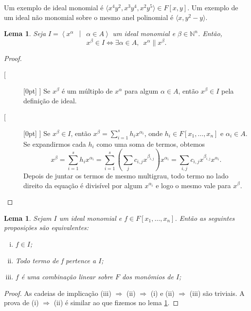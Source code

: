 \documentclass[12pt,a4paper]{report}
\newcommand{\N}{\mathbb{N}}
\newcommand{\suchthat}{\enspace\middle|\enspace}
\newcommand{\divides}{\parallel}
\newcommand{\boxedLeftArrow}{\raisebox{2pt}[\height][0pt]{
    \framebox{\raisebox{-1pt}[\height][0pt]{\(\Leftarrow\)}}}\enspace}
\newcommand{\boxedRightArrow}{\raisebox{2pt}[\height][0pt]{
    \framebox{\raisebox{-1pt}[\height][0pt]{\(\Rightarrow\)}}}\enspace}
\newtheorem{lemma}[theorem]{Lema}
\numberwithin{theorem}{chapter}
\begin{document}
Um exemplo de ideal monomial é \(\langle x^4y^2, x^3y^4, x^2y^5
\rangle \in F[x,y]\).  Um exemplo de um ideal não monomial sobre o
mesmo anel polinomial é \(\langle x, y^2-y \rangle\).

\begin{lemma}\label{lema_pertence_ao_ideal}
  Seja \(I = \left\langle x^\alpha \suchthat \alpha \in A
  \right\rangle\) um ideal monomial e \(\beta \in \N^n\).  Então,
  \[x^\beta \in I \Longleftrightarrow \exists\alpha \in A,\enspace
  x^\alpha \divides x^\beta.\]
\end{lemma}

\begin{proof}\mbox{}
  \begin{description}
    \item[\boxedLeftArrow] Se \(x^\beta\) é um múltiplo de
      \(x^\alpha\) para algum \(\alpha \in A\), então \(x^\beta \in
      I\) pela definição de ideal.

    \item[\boxedRightArrow] Se \(x^\beta \in I\), então \(x^\beta =
      \sum\limits_{i=1}^s{h_ix^{\alpha_i}}\), onde \(h_i \in
      F[x_1,\ldots,x_n]\) e \(\alpha_i \in A\).  Se expandirmos cada
      \(h_i\) como uma soma de termos, obtemos
      \[x^\beta = \sum_{i=1}^s{h_ix^{\alpha_i}} =
      \sum_{i=1}^s\left(\sum_j
        c_{i,j}x^{\beta_{i,j}}\right)x^{\alpha_i} =
      \sum_{i,j}c_{i,j}x^{\beta_{i,j}}x^{\alpha_i}.\] Depois de juntar
      os termos de mesmo multigrau, todo termo no lado direito da
      equação é divisível por algum \(x^{\alpha_i}\) e logo o mesmo
      vale para \(x^\beta\).
    \end{description}
\end{proof}

\begin{lemma}
  Sejam \(I\) um ideal monomial e \(f \in F[x_1,\ldots,x_n]\).  Então
  as seguintes proposições são equivalentes:
  \begin{enumerate}[(i)]
  \item \(f \in I\);
  \item Todo termo de f pertence a \(I\);
  \item \(f\) é uma combinação linear sobre \(F\) dos monômios de
    \(I\);
  \end{enumerate}
\end{lemma}

\begin{proof}
  As cadeias de implicação (iii) \(\Rightarrow\) (ii) \(\Rightarrow\)
  (i) e (ii) \(\Rightarrow\) (iii) são triviais.  A prova de (i)
  \(\Rightarrow\) (ii) é similar ao que fizemos no lema
  \ref{lema_pertence_ao_ideal}.
\end{proof}
\end{document}
